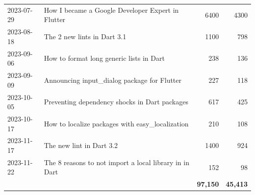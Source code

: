\begin{longtable}{|l|l|r|r|}
    2023-07-29 & How I became a Google Developer Expert in Flutter & 6400 & 4300\\
    2023-08-18 & The 2 new lints in Dart 3.1 & 1100 & 798\\
    2023-09-06 & How to format long generic lists in Dart & 238 & 136\\
    2023-09-09 & Announcing input\_dialog package for Flutter & 227 & 118\\
    2023-10-05 & Preventing dependency shocks in Dart packages & 617 & 425\\
    2023-10-17 & How to localize packages with easy\_localization & 210 & 108\\
    2023-11-17 & The new lint in Dart 3.2 & 1400 & 924\\
    2023-11-22 & The 8 reasons to not import a local library in in Dart & 152 & 98\\
    \hline
    & & \textbf{97,150} & \textbf{45,413}\\
    \hline
\end{longtable}

\pagebreak
